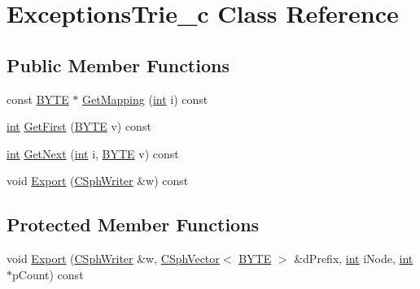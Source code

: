 \hypertarget{classExceptionsTrie__c}{\section{Exceptions\-Trie\-\_\-c Class Reference}
\label{classExceptionsTrie__c}
}
\subsection*{Public Member Functions}
\begin{DoxyCompactItemize}
\item 
const \hyperlink{sphinxstd_8h_a4ae1dab0fb4b072a66584546209e7d58}{B\-Y\-T\-E} $\ast$ \hyperlink{classExceptionsTrie__c_afe816a1ae131ad6d5fb9744dd5bd0f6a}{Get\-Mapping} (\hyperlink{sphinxexpr_8cpp_a4a26e8f9cb8b736e0c4cbf4d16de985e}{int} i) const 
\item 
\hyperlink{sphinxexpr_8cpp_a4a26e8f9cb8b736e0c4cbf4d16de985e}{int} \hyperlink{classExceptionsTrie__c_ab588c81748d8e43b0f42247ea3843319}{Get\-First} (\hyperlink{sphinxstd_8h_a4ae1dab0fb4b072a66584546209e7d58}{B\-Y\-T\-E} v) const 
\item 
\hyperlink{sphinxexpr_8cpp_a4a26e8f9cb8b736e0c4cbf4d16de985e}{int} \hyperlink{classExceptionsTrie__c_a487243163d29899111167c02f118f7a5}{Get\-Next} (\hyperlink{sphinxexpr_8cpp_a4a26e8f9cb8b736e0c4cbf4d16de985e}{int} i, \hyperlink{sphinxstd_8h_a4ae1dab0fb4b072a66584546209e7d58}{B\-Y\-T\-E} v) const 
\item 
void \hyperlink{classExceptionsTrie__c_a87a0a1d284a99d08f6d9f841911df665}{Export} (\hyperlink{classCSphWriter}{C\-Sph\-Writer} \&w) const 
\end{DoxyCompactItemize}
\subsection*{Protected Member Functions}
\begin{DoxyCompactItemize}
\item 
void \hyperlink{classExceptionsTrie__c_a4a22cbd12d8c39c48463d9469d1bc93f}{Export} (\hyperlink{classCSphWriter}{C\-Sph\-Writer} \&w, \hyperlink{classCSphVector}{C\-Sph\-Vector}$<$ \hyperlink{sphinxstd_8h_a4ae1dab0fb4b072a66584546209e7d58}{B\-Y\-T\-E} $>$ \&d\-Prefix, \hyperlink{sphinxexpr_8cpp_a4a26e8f9cb8b736e0c4cbf4d16de985e}{int} i\-Node, \hyperlink{sphinxexpr_8cpp_a4a26e8f9cb8b736e0c4cbf4d16de985e}{int} $\ast$p\-Count) const 
\end{DoxyCompactItemize}
